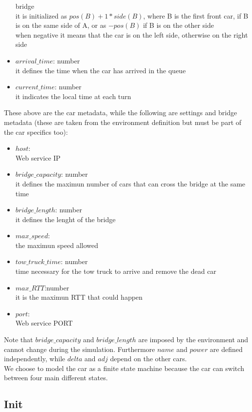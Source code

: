 \begin{itemize}
    bridge\\it is initialized as $pos(B)+1*side(B)$, where B is the first front car, if B is on the same side of A, or
    as $-pos(B)$ if B is on the other side\\ when negative it means that the car is on the left side, otherwise on the right side
    \item $arrival\_time$: number\\ it defines the time when the car has arrived in the queue
    \item $current\_time$: number\\ it indicates the local time at each turn
\end{itemize}
These above are the car metadata, while the following are settings and bridge metadata 
(these are taken from the environment definition but must be part of the car specifics too):
\begin{itemize}
    \item $host$:\\ Web service IP
    \item $bridge\_capacity$: number\\ it defines the maximun number of cars that can cross the bridge
    at the same time
    \item $bridge\_length$: number\\ it defines the lenght of the bridge
    \item $max\_speed$:\\ the maximun speed allowed
    \item $tow\_truck\_time$: number\\ time necessary for the tow truck to arrive and remove the dead car
    \item $max\_RTT$:number\\ it is the maximun RTT that could happen
    \item $port$:\\ Web service PORT
\end{itemize}

Note that $bridge\_capacity$ and $bridge\_length$ are imposed by the environment and cannot change during the
simulation. Furthermore $name$ and $power$ are defined independently, while $delta$ and $adj$ 
depend on the other cars.\\

We choose to model the car as a finite state machine because the car can switch between four main different states. 
\subsection{Init}

